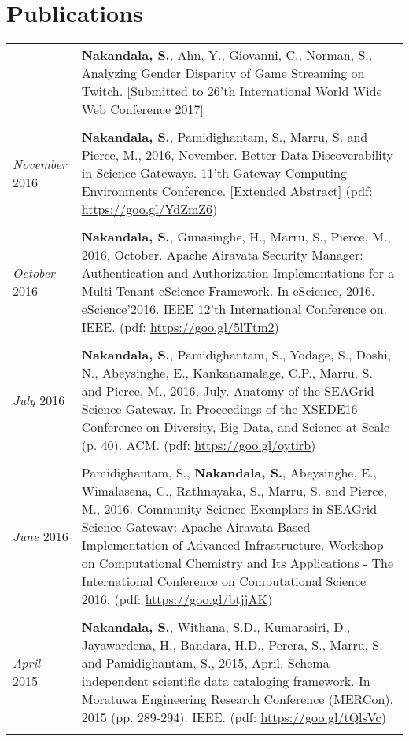 \documentclass[a4paper,10pt]{article}
\begin{document}
\section{Publications}

\begin{tabular}{p{3cm}|p{13.5cm}}

& \textbf{Nakandala, S.}, Ahn, Y., Giovanni, C., Norman, S., Analyzing Gender Disparity of Game Streaming on Twitch. [Submitted to 26'th International World Wide Web Conference 2017]\\\\

\emph{November} 2016 & \textbf{Nakandala, S.}, Pamidighantam, S., Marru, S. and Pierce, M., 2016, November. Better Data Discoverability in Science Gateways. 11'th Gateway Computing Environments Conference. [Extended Abstract] (pdf: \url{https://goo.gl/YdZmZ6})\\\\

\emph{October} 2016 & \textbf{Nakandala, S.}, Gunasinghe, H., Marru, S., Pierce, M., 2016, October. Apache Airavata Security Manager: Authentication and Authorization Implementations for a Multi-Tenant eScience Framework. In eScience, 2016. eScience'2016. IEEE 12'th International Conference on. IEEE. (pdf: \url{https://goo.gl/5lTtm2})\\\\

\emph{July} 2016 & \textbf{Nakandala, S.}, Pamidighantam, S., Yodage, S., Doshi, N., Abeysinghe, E., Kankanamalage, C.P., Marru, S. and Pierce, M., 2016, July. Anatomy of the SEAGrid Science Gateway. In Proceedings of the XSEDE16 Conference on Diversity, Big Data, and Science at Scale (p. 40). ACM. (pdf: \url{https://goo.gl/oytirb})\\\\

\emph{June} 2016 & Pamidighantam, S., \textbf{Nakandala, S.}, Abeysinghe, E., Wimalasena, C., Rathnayaka, S., Marru, S. and Pierce, M., 2016. Community Science Exemplars in SEAGrid Science Gateway: Apache Airavata Based Implementation of Advanced Infrastructure. Workshop on Computational Chemistry and Its Applications - The International Conference on Computational Science 2016. (pdf: \url{https://goo.gl/btjjAK})\\\\

\emph{April} 2015 & \textbf{Nakandala, S.}, Withana, S.D., Kumarasiri, D., Jayawardena, H., Bandara, H.D., Perera, S., Marru, S. and Pamidighantam, S., 2015, April. Schema-independent scientific data cataloging framework. In Moratuwa Engineering Research Conference (MERCon), 2015 (pp. 289-294). IEEE. (pdf: \url{https://goo.gl/tQlsVc})\\\\


\end{tabular}
\end{document}
